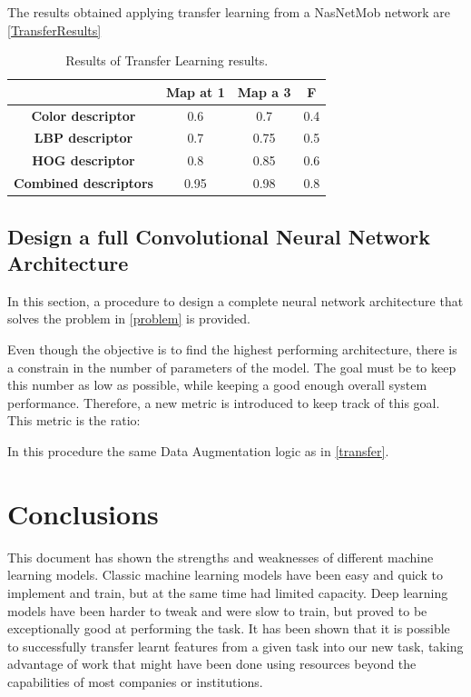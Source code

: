 \documentclass[runningheads]{llncs}
\begin{document}
The results obtained applying transfer learning from a NasNetMob network are \ref{TransferResults}

\begin{table}[ht!] \label{TransferResults}
\caption{Results of Transfer Learning results.}
\begin{center}
\begin{tabular}{ | c | c | c | c | }
\hline
 & \textbf{Map at 1} & \textbf{Map a 3} & \textbf{F} \\ 
 \hline
 \textbf{Color descriptor} & 0.6 & 0.7 & 0.4 \\  
 \hline
 \textbf{LBP descriptor} & 0.7 & 0.75 & 0.5 \\ 
 \hline
 \textbf{HOG descriptor} & 0.8 & 0.85 & 0.6 \\  
 \hline
 \textbf{Combined descriptors} & 0.95 & 0.98 & 0.8 \\  
 \hline
\end{tabular}
\label{sample table}
\end{center}
\end{table}

\subsection{Design a full Convolutional Neural Network Architecture}

In this section, a procedure to design a complete neural network architecture that solves the problem in \ref{problem} is provided.

Even though the objective is to find the highest performing architecture, there is a constrain in the number of parameters of the model. 
The goal must be to keep this number as low as possible, while keeping a good enough overall system performance. Therefore, a new metric is introduced to keep track of this goal. This metric is the ratio:

In this procedure the same Data Augmentation logic as in \ref{transfer}.


\section{Conclusions}

This document has shown the strengths and weaknesses of different machine learning models.
Classic machine learning models have been easy and quick to implement and train, but at the same time had limited capacity.
Deep learning models have been harder to tweak and were slow to train, but proved to be exceptionally good at performing the task.
It has been shown that it is possible to successfully transfer learnt features from a given task into our new task, taking advantage of work that might have been done using resources beyond the capabilities of most companies or institutions.




\end{document}
